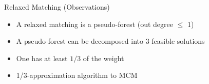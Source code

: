 \begin{frame}[<+->]{Relaxed Matching (Observations)}
\begin{itemize}
  \item A relaxed matching is a pseudo-forest (out degree $\leq$ 1)
  \item A pseudo-forest can be decomposed into 3 feasible solutions
  \item One has at least $1/3$ of the weight 
  \item 1/3-approximation algorithm to MCM
\end{itemize}
\centering

\end{frame}